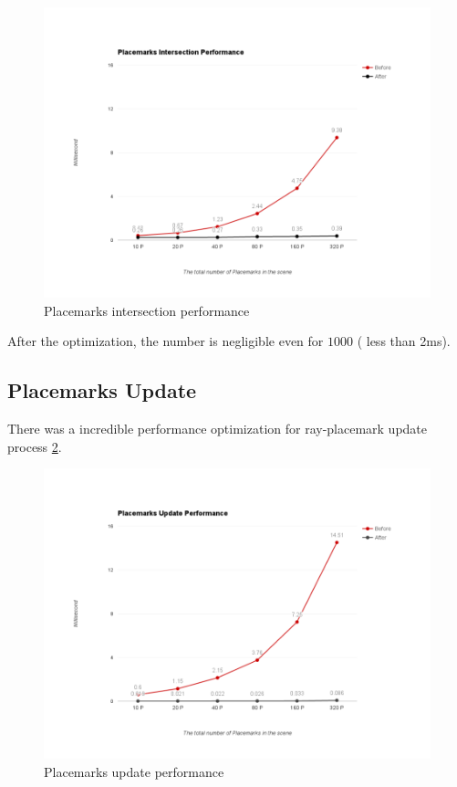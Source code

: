 \begin{figure}[H]
	\caption{Placemarks intersection performance}
	\label{fig:placemarks-intersection-performance}
	\centering
	\includegraphics[width=\textwidth, keepaspectratio]{Figures/placemarks-intersection-performance.png}
	\decoRule
\end{figure}

After the optimization, the number is negligible even for $1000$  ( less than 2ms).

\subsection{Placemarks Update}
\label{section:placemarks-update}


There was a incredible performance optimization for ray-placemark update process \ref{fig:placemarks-update-performance}. 

\begin{figure}[H]
	\caption{Placemarks update performance}
	\label{fig:placemarks-update-performance}
	\centering
	\includegraphics[width=\textwidth, keepaspectratio]{Figures/placemarks-update-performance.png}
	\decoRule
\end{figure}

